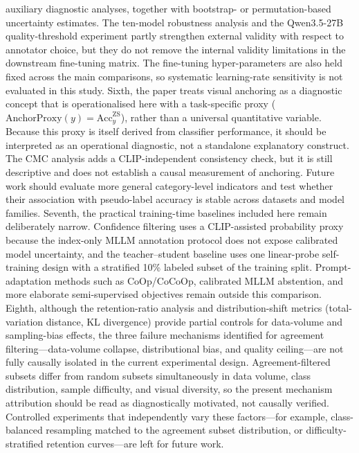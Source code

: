 \documentclass{ieeeaccess}
\begin{document}
auxiliary diagnostic analyses, together with bootstrap- or
permutation-based uncertainty estimates.
The ten-model robustness analysis and the Qwen3.5-27B quality-threshold
experiment partly strengthen external validity with respect to annotator
choice, but they do not remove the internal validity limitations in the
downstream fine-tuning matrix.
The fine-tuning hyper-parameters are also held fixed across the main
comparisons, so systematic learning-rate sensitivity is not evaluated
in this study.
Sixth, the paper treats visual anchoring as a
diagnostic concept that is operationalised here with a task-specific
proxy ($\mathrm{AnchorProxy}(y)=\mathrm{Acc}^{\mathrm{ZS}}_{y}$), rather
than a universal quantitative variable.
Because this proxy is itself derived from classifier performance, it
should be interpreted as an operational diagnostic, not a
standalone explanatory construct.
The CMC analysis adds a CLIP-independent consistency check, but it is
still descriptive and does not establish a causal measurement of
anchoring.
Future work should evaluate more general category-level indicators and
test whether their association with pseudo-label accuracy is stable
across datasets and model families.
Seventh, the practical training-time baselines included here remain
deliberately narrow. Confidence filtering uses a CLIP-assisted
probability proxy because the index-only MLLM annotation protocol does
not expose calibrated model uncertainty, and the teacher--student
baseline uses one linear-probe self-training design with a stratified
10\% labeled subset of the training split.
Prompt-adaptation methods such as CoOp/CoCoOp, calibrated MLLM
abstention, and more elaborate semi-supervised objectives remain
outside this comparison.
Eighth, although the retention-ratio analysis and distribution-shift
metrics (total-variation distance, KL divergence) provide partial
controls for data-volume and sampling-bias effects, the three failure
mechanisms identified for agreement filtering---data-volume collapse,
distributional bias, and quality ceiling---are not fully causally
isolated in the current experimental design. Agreement-filtered
subsets differ from random subsets simultaneously in data volume,
class distribution, sample difficulty, and visual diversity, so the
present mechanism attribution should be read as diagnostically
motivated, not causally verified. Controlled experiments that
independently vary these factors---for example, class-balanced
resampling matched to the agreement subset distribution, or
difficulty-stratified retention curves---are left for future work.
\end{document}
